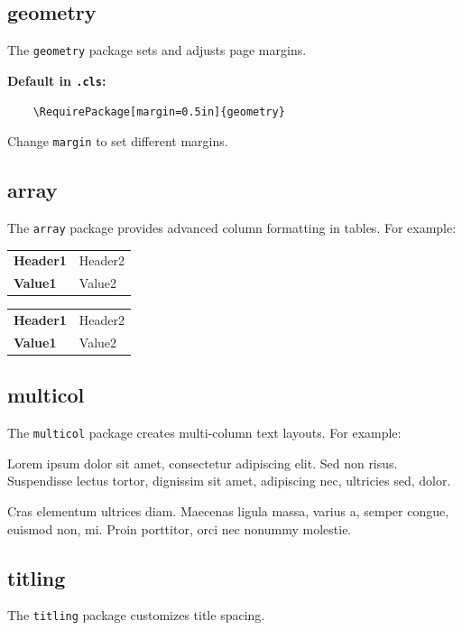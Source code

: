 \documentclass{lecturenotes}
\begin{document}
\newpage
\subsection{geometry}
The \texttt{geometry} \cite{ctan:geometry} package sets and adjusts page margins.


\textbf{Default in \texttt{.cls}:}
\begin{verbatim}
    \RequirePackage[margin=0.5in]{geometry}
\end{verbatim}

Change \texttt{margin} to set different margins.

\subsection{array}
The \texttt{array} \cite{ctan:array} package provides advanced column formatting in tables. For example:
\begin{codeblock}
\begin{tabular}{>{\bfseries}l l}
    Header1 & Header2 \\
    Value1  & Value2
\end{tabular}    
\end{codeblock}

\begin{tabular}{>{\bfseries}l l}
Header1 & Header2 \\
Value1 & Value2
\end{tabular}

\subsection{multicol}
The \texttt{multicol} \cite{ctan:multicol} package creates multi-column text layouts. For example:

\begin{multicols}{2}
Lorem ipsum dolor sit amet, consectetur adipiscing elit. Sed non risus. Suspendisse lectus tortor, dignissim sit amet, adipiscing nec, ultricies sed, dolor.

\columnbreak

Cras elementum ultrices diam. Maecenas ligula massa, varius a, semper congue, euismod non, mi. Proin porttitor, orci nec nonummy molestie.
\end{multicols}



\subsection{titling}
The \texttt{titling} \cite{ctan:titling} package customizes title spacing.
\end{document}
